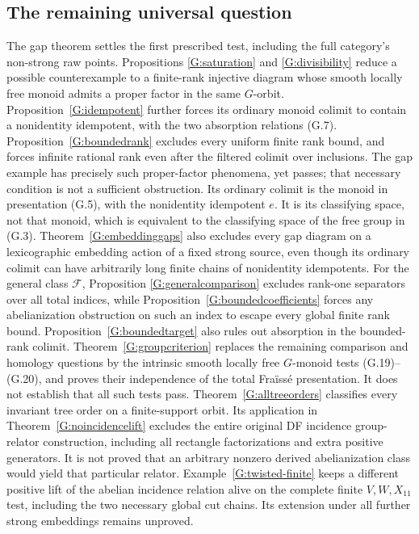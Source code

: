 \subsection{The remaining universal question}

The gap theorem settles the first prescribed test, including the
full category's non-strong raw points.  Propositions
\ref{G:saturation} and \ref{G:divisibility} reduce a possible
counterexample to a finite-rank injective diagram whose smooth
locally free monoid admits a proper factor in the same $G$-orbit.
Proposition~\ref{G:idempotent} further forces its ordinary
monoid colimit to contain a nonidentity idempotent, with the
two absorption relations (G.7).
Proposition~\ref{G:boundedrank} excludes every uniform finite
rank bound, and forces infinite rational rank even after the
filtered colimit over inclusions.
The gap example has precisely such proper-factor phenomena, yet
passes; that necessary condition is not a sufficient obstruction.
Its ordinary colimit is the monoid in presentation (G.5), with
the nonidentity idempotent $e$.  It is its classifying space,
not that monoid, which is equivalent to the classifying space
of the free group in (G.3).
Theorem~\ref{G:embeddinggaps} also excludes every gap diagram
on a lexicographic embedding action of a fixed strong source,
even though its ordinary colimit can have arbitrarily long
finite chains of nonidentity idempotents.
For the general class $\mathcal F$, Proposition
\ref{G:generalcomparison} excludes rank-one separators over
all total indices, while Proposition~\ref{G:boundedcoefficients}
forces any abelianization obstruction on such an index to
escape every global finite rank bound. Proposition~\ref{G:boundedtarget}
also rules out absorption in the bounded-rank colimit.
Theorem~\ref{G:groupcriterion} replaces the remaining comparison
and homology questions by the intrinsic smooth locally free
$G$-monoid tests (G.19)--(G.20), and proves their independence
of the total Fra\"iss\'e presentation. It does not establish
that all such tests pass. Theorem~\ref{G:alltreeorders}
classifies every invariant tree order on a finite-support orbit.
Its application in Theorem~\ref{G:noincidencelift} excludes the
entire original DF incidence group-relator construction, including
all rectangle factorizations and extra positive generators. It is
not proved that an arbitrary nonzero derived abelianization class
would yield that particular relator. Example~\ref{G:twisted-finite}
keeps a different positive lift of the abelian incidence relation
alive on the complete finite $V,W,X_{11}$ test, including the two
necessary global cut chains. Its extension under all further strong
embeddings remains unproved.

